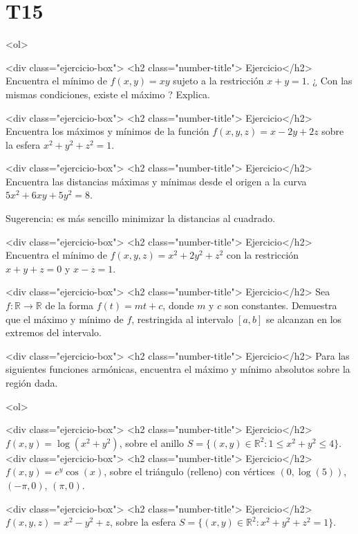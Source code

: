 \documentclass{article}
\theoremstyle{definition}
\begin{document}
  \section*{T15 }

  
  
	<ol>


          
        <div class="ejercicio-box"> <h2 class="number-title"> Ejercicio</h2> Encuentra el mínimo de $f(x,y)=xy$ sujeto a la
          restricción $x+y=1$. ¿ Con las
          mismas condiciones, existe el máximo ? Explica.
          
        <div class="ejercicio-box"> <h2 class="number-title"> Ejercicio</h2> Encuentra los máximos y mínimos de la función
          $f(x,y,z)=x-2y+2z$ sobre la esfera $x^2+y^2+z^2=1$.

          
        <div class="ejercicio-box"> <h2 class="number-title"> Ejercicio</h2> Encuentra las distancias máximas y mínimas 
          desde el origen a la curva $5x^2+6xy+5y^2=8$.

          Sugerencia: es más sencillo minimizar la distancias al cuadrado.


    
        <div class="ejercicio-box"> <h2 class="number-title"> Ejercicio</h2> Encuentra el mínimo de $f(x,y,z)=x^2+2y^2+z^2$ con
          la restricción $x+y+z=0$ y $x-z=1$.

		
		<div class="ejercicio-box"> <h2 class="number-title"> Ejercicio</h2> Sea $f:\mathbb{R}\to \mathbb{R}$ de la forma $f(t)=mt+c$, donde
		$m$ y $c$ son constantes. Demuestra que el máximo y mínimo de
		$f$, restringida al intervalo $[a,b]$ se alcanzan en los extremos del intervalo.
          
        <div class="ejercicio-box"> <h2 class="number-title"> Ejercicio</h2> Para las siguientes funciones armónicas, encuentra
          el máximo y mínimo absolutos sobre la región dada.

          <ol>
         
          <div class="ejercicio-box"> <h2 class="number-title"> Ejercicio</h2> $f(x,y)=\log(x^2+y^2)$, sobre el anillo
            $S=\{(x,y)\in \mathbb{R}^2:  1\leq  x^2+y^2\leq 4\}$.
          <div class="ejercicio-box"> <h2 class="number-title"> Ejercicio</h2> $f(x,y)=e^y\cos(x)$, sobre el triángulo (relleno)
            con vértices $(0,\log(5))$, $(-\pi,0)$, $(\pi,0)$.

             <div class="ejercicio-box"> <h2 class="number-title"> Ejercicio</h2> $f(x,y,z)=x^2-y^2+z$, sobre la esfera
            $S=\{(x,y)\in \mathbb{R}^2: x^2+y^2+z^2=1\}$.
            
\end{document}
